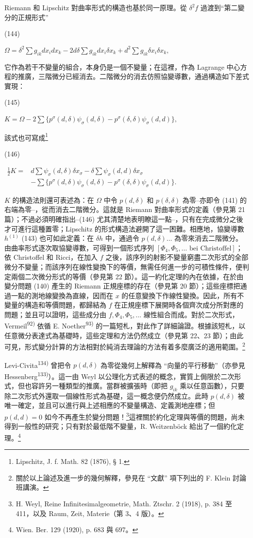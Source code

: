 \documentclass[11pt]{article}
\providecommand{\glqq}{“}
\providecommand{\grqq}{”}
\providecommand{\srcnumdisplay}[3][3.4em]{%
  \par\smallskip\noindent
  \begin{minipage}[t]{#1}\vspace*{0pt}#2\end{minipage}%
  \begin{minipage}[t]{\dimexpr\linewidth-#1\relax}\vspace*{0pt}\centering
  \(\displaystyle #3\)
  \end{minipage}\par\smallskip}
\begin{document}
Riemann 和 Lipschitz 對曲率形式的構造也基於同一原理。從 $\delta^2 f$ 過渡到\glqq{}第二變分的正規形式\grqq{}
\srcnumdisplay{(144)}{\Omega=\delta^2\sum g_{ik}dx_i dx_k
-2d\delta\sum g_{ik}dx_i\delta x_k
+d^2\sum g_{ik}\delta x_i\delta x_k,}
它作為若干不變量的組合，本身仍是一個不變量；在這裡，作為 Lagrange 中心方程的推廣，三階微分已經消去。二階微分的消去仿照協變導數，通過構造如下差式實現：
\srcnumdisplay{(145)}{K=\Omega-2\sum\{p^\sigma(d,\delta)\psi_\sigma(d,\delta)
-p^\sigma(\delta,\delta)\psi_\sigma(d,d)\},}
該式也可寫成\footnote{Lipschitz, J. f. Math. 82 (1876), § 1.}
\srcnumdisplay{(146)}{\begin{aligned}
\frac12 K={}&d\sum\psi_\sigma(d,\delta)\delta x_\sigma
-\delta\sum\psi_\sigma(d,d)\delta x_\sigma\\
&-\sum\{p^\sigma(d,\delta)\psi_\sigma(d,\delta)
-p^\sigma(\delta,\delta)\psi_\sigma(d,d)\}.
\end{aligned}}
$K$ 的構造法則還可表述為：在 $\Omega$ 中令 $p(d,\delta)$ 和 $p(\delta,\delta)$ 為零--亦即令 (141) 的右端為零--，從而消去二階微分。這就是 Riemann 對曲率形式的定義（參見第 21 篇）；不過必須明確指出--(146) 尤其清楚地表明瞭這一點--，只有在完成微分之後才可進行這種置零；Lipschitz 的形式構造法避開了這一困難。相應地，協變導數 $h^{(1)}$ (143) 也可如此定義：在 $\delta h$ 中，通過令 $p(d,\delta)\ldots$ 為零來消去二階微分。
由曲率形式逐次取協變導數，可得到一個形式序列 $[\Phi_4,\Phi_5,\ldots\text{ bei Christoffel}]$；依 Christoffel 和 Ricci，在加入 $f$ 之後，該序列的射影不變量窮盡二次形式的全部微分不變量；而該序列在線性變換下的等價，無需任何進一步的可積性條件，便判定兩個二次微分形式的等價（參見第 22 節）。這一約化定理的內在依據，在於由變分問題 (140) 產生的 Riemann 正規座標的存在（參見第 20 節）；這些座標把通過一點的測地線變換為直線，因而在 $x$ 的任意變換下作線性變換。因此，所有不變量的構造和等價問題，都歸結為 $f$ 在正規座標下展開時各個齊次成分所對應的問題；並且可以證明，這些成分由 $f,\Phi_4,\Phi_5,\ldots$ 線性組合而成。對於二次形式，Vermeil\textsuperscript{92)} 依循 E. Noether\textsuperscript{93)} 的一篇短札，對此作了詳細論證。根據該短札，以任意微分表達式為基礎時，這些定理和方法仍然成立（參見第 22、23 節）；由此可見，形式變分計算的方法相對於純消去理論的方法有着多麼廣泛的適用範圍。\footnote{關於以上論述及進一步的幾何解釋，參見在 \glqq{}文獻\grqq{} 項下列出的 F. Klein 討論班講演。}

Levi-Civita\textsuperscript{134)} 曾把令 $p(d,\delta)$ 為零從幾何上解釋為 \glqq{}向量的平行移動\grqq{}（亦參見 Hessenberg\textsuperscript{133)}）。這一由 Weyl 以公理化方式表述的概念，實質上侷限於二次形式，但也容許另一種類型的推廣。當群被擴張時（即把 $g_{ik}$ 乘以任意函數），只要除二次形式外還取一個線性形式為基礎，這一概念便仍然成立。此時 $p(d,\delta)$ 被唯一確定，並且可以進行與上述相應的不變量構造、定義測地座標；但 $p(d,d)=0$ 如今不再產生於變分問題！\footnote{H. Weyl, Reine Infinitesimalgeometrie, Math. Ztschr. 2 (1918), p. 384 至 411，以及 Raum, Zeit, Materie（第 3、4 版）。}這裡關於約化定理與等價的問題，尚未得到一般性的研究；只有對於最低階不變量，R. Weitzenböck 給出了一個約化定理。\footnote{Wien. Ber. 129 (1920), p. 683 與 697。}
\end{document}
